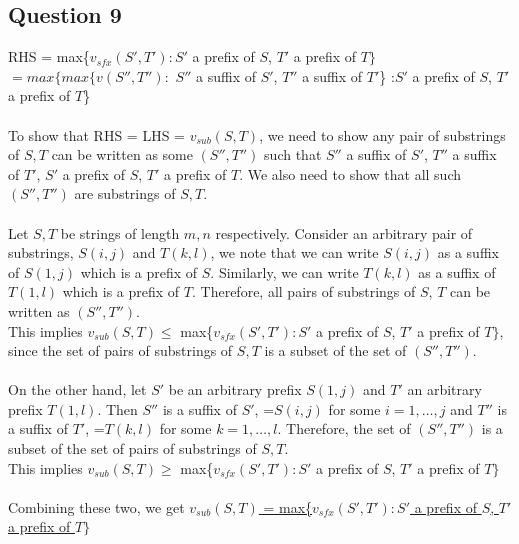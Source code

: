 \documentclass[10pt]{article}
\begin{document}
\subsection*{Question 9}
RHS = max\{$v_{sfx}(S',T'):S'$ a prefix of $S$, $T'$ a prefix of $
T\}$\\
$=max\{max\{v(S'',T''):$ $S''$ a suffix of $S'$, $T''$ a suffix of $T'$\} :$S'$ a prefix of $S$, $T'$ a prefix of $T$\}\\\\
To show that RHS = LHS = $v_{sub}(S,T)$, we need to show any pair of substrings of $S,T$ can be written as some $(S'',T'')$ such that $S''$ a suffix of $S'$, $T''$ a suffix of $T'$, $S'$ a prefix of $S$, $T'$ a prefix of $T$. We also need to show that all such $(S'',T'')$ are substrings of $S,T$.\\\\
Let $S,T$ be strings of length $m,n$ respectively. Consider an arbitrary pair of substrings, $S(i,j)$ and $T(k,l)$, we note that we can write $S(i,j)$ as a suffix of $S(1,j)$ which is a prefix of $S$. Similarly, we can write $T(k,l)$ as a suffix of $T(1,l)$ which is a prefix of $T$. Therefore, all pairs of substrings of $S$, $T$ can be written as $(S'',T'')$.\\
This implies $v_{sub}(S,T) \leq$ max\{$v_{sfx}(S',T'):S'$ a prefix of $S$, $T'$ a prefix of $T\}$, since the set of pairs of substrings of $S,T$ is a subset of the set of $(S'',T'')$.\\\\
On the other hand, let $S'$ be an arbitrary prefix $S(1,j)$ and $T'$ an arbitrary prefix $T(1,l)$. Then $S''$ is a suffix of $S'$, =$S(i,j)$ for some $i=1,\dots,j$ and $T''$ is a suffix of $T'$, =$T(k,l)$ for some $k=1,\dots,l$. Therefore, the set of $(S'',T'')$ is a subset of the set of pairs of substrings of $S,T$.\\
This implies $v_{sub}(S,T) \geq$ max\{$v_{sfx}(S',T'):S'$ a prefix of $S$, $T'$ a prefix of $T\}$\\\\
Combining these two, we get \underline{$v_{sub}(S,T)$ = max\{$v_{sfx}(S',T'):S'$ a prefix of $S$, $T'$ a prefix of $T\}$}
\end{document}
